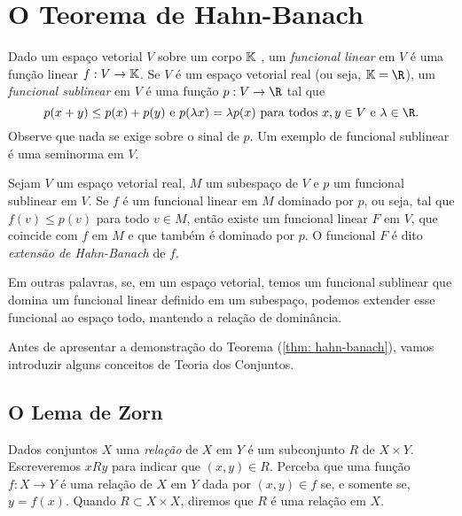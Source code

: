 \section{O Teorema de Hahn-Banach}

Dado um espaço vetorial \( V \) sobre um corpo \( \mathbb{K} \) , um \emph{funcional linear} em \( V \) é uma função linear \( f : V \to \mathbb{K} \).
Se \( V \) é um espaço vetorial real (ou seja, \( \K = \R \)), um \emph{funcional sublinear} em \( V \) é uma função \( p : V \to \R \) tal que \[
    p ( x + y ) \leq p(x) + p(y) \text{ e } p(\lambda x) = \lambda p(x) \text{ para todos \( x, y \in V \) e \( \lambda \in \R \)}
.\]
Observe que nada se exige sobre o sinal de \( p \).
Um exemplo de funcional sublinear é uma seminorma em \( V \).

\begin{teo}
    \label{thm: hahn-banach}
    Sejam \( V \) um espaço vetorial real, \( M \) um subespaço de \( V \) e \( p \) um funcional sublinear em \( V \).
    Se \( f \) é um funcional linear em \( M \) dominado por \( p \), ou seja, tal que \( f(v) \leq p(v) \) para todo \( v \in M \), então existe um funcional linear \( F \) em \( V \), que coincide com \( f \) em \( M \) e que também é dominado por \( p \).
    O funcional \( F \) é dito \emph{extensão de Hahn-Banach} de \( f \).
\end{teo}

Em outras palavras, se, em um espaço vetorial, temos um funcional sublinear que domina um funcional linear definido em um subespaço, podemos extender esse funcional ao espaço todo, mantendo a relação de dominância.

Antes de apresentar a demonstração do Teorema (\ref{thm: hahn-banach}), vamos introduzir alguns conceitos de Teoria dos Conjuntos.


\subsection{O Lema de Zorn}

Dados conjuntos \( X \) uma \emph{relação} de \( X \) em \( Y \) é um subconjunto \( R \) de \( X \times Y \). 
Escreveremos \( x R y \) para indicar que \( ( x, y ) \in R \).
Perceba que uma função \( f : X \to Y \) é uma relação de \( X \) em \( Y \) dada por \( ( x, y ) \in f \) se, e somente se, \( y = f(x) \).
Quando \( R \subset X \times X \), diremos que \( R \) é uma relação em \( X \).

